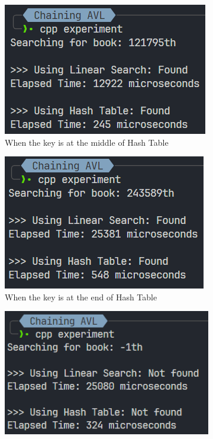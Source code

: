 \begin{itemize}
\begin{figure}[!ht]
\begin{subfigure}{0.45\textwidth}
			      \includegraphics[width=\textwidth]{imgs/Chaining AVL/mid.png}
			      \caption{When the key is at the middle of Hash Table}\label{fig:chainingavl-mid-metric}
		      \end{subfigure}
		      \hfill
		      \begin{subfigure}{0.45\textwidth}
			      \centering
			      \includegraphics[width=\textwidth]{imgs/Chaining AVL/end.png}
			      \caption{When the key is at the end of Hash Table}\label{fig:chainingavl-end-metric}
		      \end{subfigure}
		      \hfill
		      \begin{subfigure}{0.45\textwidth}
			      \centering
			      \includegraphics[width=\textwidth]{imgs/Chaining AVL/not-found.png}

\end{subfigure}
\end{figure}
\end{itemize}
